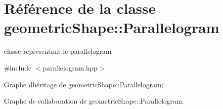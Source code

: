 \hypertarget{classgeometric_shape_1_1_parallelogram}{}\section{Référence de la classe geometric\+Shape\+:\+:Parallelogram}
\label{classgeometric_shape_1_1_parallelogram}


classe representant le parallelogram  




{\ttfamily \#include $<$parallelogram.\+hpp$>$}



Graphe d\textquotesingle{}héritage de geometric\+Shape\+:\+:Parallelogram\+:


Graphe de collaboration de geometric\+Shape\+:\+:Parallelogram\+:
